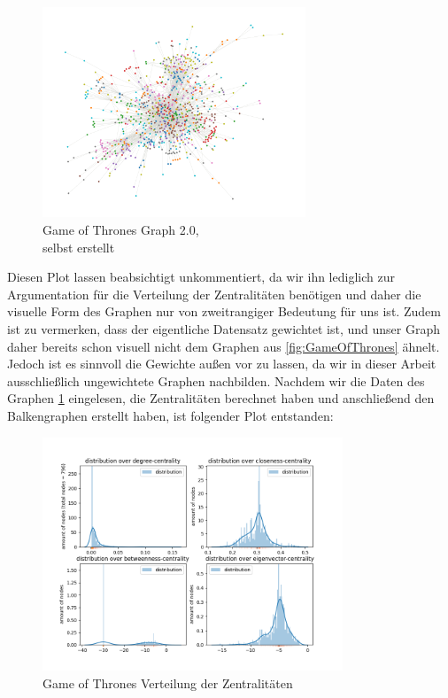 \FloatBarrier
\begin{figure}[h!]%
  \centering
  \includegraphics[width=0.7\textwidth]{Graphics/GOTPlot.png}
  \caption{Game of Thrones Graph 2.0, \\
  selbst erstellt}
  \label{fig:GOT2.0}
\end{figure}
\FloatBarrier

Diesen Plot lassen beabsichtigt unkommentiert, da wir ihn lediglich zur Argumentation für die Verteilung der Zentralitäten benötigen und daher die visuelle Form des Graphen nur von zweitrangiger Bedeutung für uns ist. Zudem ist zu vermerken, dass der eigentliche Datensatz gewichtet ist, und unser Graph daher bereits schon visuell nicht dem Graphen aus \ref{fig:GameOfThrones} ähnelt. Jedoch ist es sinnvoll die Gewichte außen vor zu lassen, da wir in dieser Arbeit ausschließlich ungewichtete Graphen nachbilden. Nachdem wir die Daten des Graphen \ref{fig:GOT2.0} eingelesen, die Zentralitäten berechnet haben und anschließend den Balkengraphen erstellt haben, ist folgender Plot entstanden:

\FloatBarrier
\begin{figure}[h!]%
  \centering
   \includegraphics[width=0.8\textwidth]{Graphics/GOT-Distribution.png}
  \caption{Game of Thrones Verteilung der Zentralitäten}
  \label{fig:distributionGOT}
\end{figure}
\FloatBarrier
 
